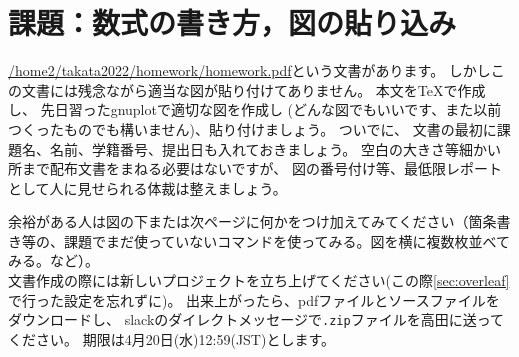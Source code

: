 
\section{課題：数式の書き方，図の貼り込み}
\underline{/home2/takata2022/homework/homework.pdf}という文書があります。
しかしこの文書には残念ながら適当な図が貼り付けてありません。
本文を{\TeX}で作成し、
先日習ったgnuplotで適切な図を作成し
(どんな図でもいいです、また以前つくったものでも構いません)、貼り付けましょう。
ついでに、
文書の最初に課題名、名前、学籍番号、提出日も入れておきましょう。
空白の大きさ等細かい所まで配布文書をまねる必要はないですが、
図の番号付け等、最低限レポートとして人に見せられる体裁は整えましょう。

余裕がある人は図の下または次ページに何かをつけ加えてみてください（箇条書き等の、課題でまだ使っていないコマンドを使ってみる。図を横に複数枚並べてみる。など）。
\\

文書作成の際には新しいプロジェクトを立ち上げてください(この際\ref{sec:overleaf}で行った設定を忘れずに)。
出来上がったら、pdfファイルとソースファイルをダウンロードし、
slackのダイレクトメッセージで\verb+.zip+ファイルを高田に送ってください。
期限は4月20日(水)12:59(JST)とします。



\pagebreak
